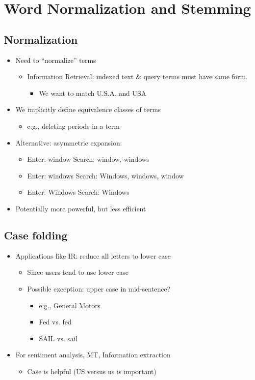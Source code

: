 \documentclass[11pt]{article}
\theoremstyle{definition}
\begin{document}
\section{Word Normalization and
Stemming}
\subsection{Normalization}
\begin{itemize}
  \item Need to “normalize” terms
  \begin{itemize}
    \item Information Retrieval: indexed text \& query terms must have same form.
    \begin{itemize}
      \item We want to match U.S.A. and USA
    \end{itemize}
  \end{itemize}
  \item We implicitly define equivalence classes of terms
  \begin{itemize}
    \item e.g., deleting periods in a term
  \end{itemize}
  \item Alternative: asymmetric expansion:
  \begin{itemize}
    \item Enter: window       Search: window, windows
    \item Enter: windows      Search: Windows, windows, window
    \item Enter: Windows      Search: Windows
  \end{itemize}
  \item Potentially more powerful, but less efficient
\end{itemize}

\subsection{Case folding}
\begin{itemize}
  \item Applications like IR: reduce all letters to lower case
  \begin{itemize}
    \item Since users tend to use lower case
    \item Possible exception: upper case in mid-sentence?
    \begin{itemize}
      \item e.g., General Motors
      \item Fed vs. fed
      \item SAIL vs. sail
    \end{itemize}
  \end{itemize}
  \item For sentiment analysis, MT, Information extraction
  \begin{itemize}
    \item Case is helpful (US versus us is important)
  \end{itemize}
\end{itemize}
\end{document}
